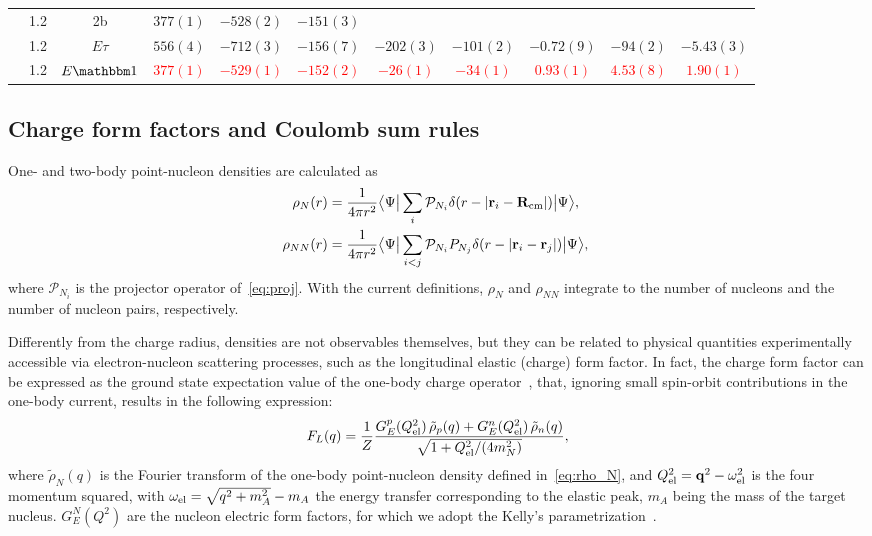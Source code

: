 \documentclass[aps,prc,twocolumn,superscriptaddress,floatfix]{revtex4-1}
\newcommand{\red}[1]{\protect\textcolor{red}{#1}}
\begin{document}
\begin{table}[htb]
\begin{tabular}{ccccccccccc}
                & 1.2 & 2b           & $377(1)$      & $-528(2)$   & $-151(3)$            &            &              &              &            &            \\
                & 1.2 & $E\tau$      & $556(4)$      & $-712(3)$   & $-156(7)$            & $-202(3)$  & $-101(2)$    & $-0.72(9)$   & $-94(2)$   & $-5.43(3)$ \\
                & 1.2 & $E\mathbbm1$ & \red{$377(1)$}      & \red{$-529(1)$}   & \red{$-152(2)$}            & \red{$-26(1)$}   & \red{$-34(1)$}     & \red{$0.93(1)$}    & \red{$4.53(8)$}  & \red{$1.90(1)$}\\
\hline\hline
\end{tabular}
\label{tab:v3}
\end{table}
\setlength{\tabcolsep}{10pt}


\subsection{Charge form factors and Coulomb sum rules}
One- and two-body point-nucleon densities are calculated as
\begin{align}
	\!\!\rho_{N}(r) &=\frac{1}{4\pi r^2}\big\langle\Psi\big|\sum_i    \mathcal P_{N_i}\delta(r-|\vb{r}_i-\vb{R}_{\rm cm}|)\big|\Psi\big\rangle, \label{eq:rho_N} \\
	\!\!\rho_{NN}(r)&=\frac{1}{4\pi r^2}\big\langle\Psi\big|\sum_{i<j}\mathcal P_{N_i}P_{N_j}\delta(r-|\vb{r}_i-\vb{r}_j|)\big|\Psi\big\rangle, \label{eq:rho_NN}
\end{align}
where $\mathcal P_{N_i}$ is the projector operator of~\cref{eq:proj}.
With the current definitions, $\rho_N$ and $\rho_{NN}$ integrate to the number 
of nucleons and the number of nucleon pairs, respectively.

Differently from the charge radius, densities are not observables themselves, 
but they can be related to physical quantities experimentally accessible via 
electron-nucleon scattering processes, such as the longitudinal elastic (charge) form factor.
In fact, the charge form factor can be expressed as the ground state expectation value of 
the one-body charge operator~\cite{Mcvoy:1962},
that, ignoring small spin-orbit contributions in the one-body current, 
results in the following expression:
\begin{align}
	F_L(q)=\frac{1}{Z}\frac{G_E^p(Q_{\rm el}^2)\,\tilde{\rho}_p(q)+G_E^n(Q_{\rm el}^2)\,\tilde{\rho}_n(q)}{\sqrt{1+Q_{\rm el}^2/(4 m_N^2)}},
	\label{eq:ff}
\end{align}
where $\tilde{\rho}_{N}(q)$ is the Fourier transform of the one-body point-nucleon density defined in~\cref{eq:rho_N}, 
and $Q^2_{\rm el}=\vb{q}^2-\omega_{\rm el}^2$ is the four momentum squared, 
with $\omega_{\rm el}=\sqrt{q^2+m_A^2}-m_A$ the energy transfer corresponding to the elastic peak,
$m_A$ being the mass of the target nucleus.
$G_E^N(Q^2)$ are the nucleon electric form factors, for which we adopt the Kelly's parametrization~\cite{Kelly:2004}.
\end{document}
